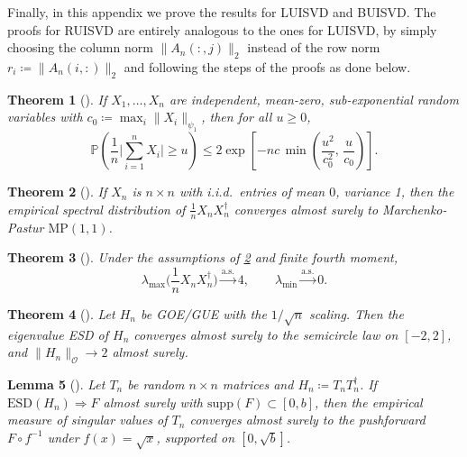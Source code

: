 \documentclass[11pt,a4paper]{article}
\newtheorem{theorem}{Theorem}[section]
\newtheorem{lemma}[theorem]{Lemma}
\newcommand{\op}{\mathcal{O}}
\newcommand{\Prob}{\mathbb{P}}
\begin{document}
Finally, in this appendix we prove the results for LUISVD and BUISVD. The proofs for RUISVD are entirely analogous to the ones for LUISVD, by simply choosing the column norm $\|A_n(:,j)\|_2$ instead of the row norm $r_i\coloneq \|A_n(i,:)\|_2$ and following the steps of the proofs as done below.
\begin{theorem}[{\cite{Vershynin2018HDP}}]\label{thm:bernstein-subexp}
If $X_1,\dots,X_n$ are independent, mean-zero, sub-exponential random variables with $c_0\coloneq \max_i\|X_i\|_{\psi_1}$, then for all $u\ge0$,
\begin{equation}
\Prob\!\left(\frac{1}{n}\Big|\sum_{i=1}^n X_i\Big|\ge u\right)\le 2\exp\!\left[-nc\,\min\!\left(\frac{u^2}{c_0^2},\,\frac{u}{c_0}\right)\right].
\end{equation}
\end{theorem}
\begin{theorem}[{\cite{BaiSilverstein2010}}]\label{thm:MP-law}
If $X_n$ is $n\times n$ with i.i.d.\ entries of mean $0$, variance 1, then the empirical spectral distribution of $\frac1n X_nX_n^\dagger$ converges almost surely to Marchenko-Pastur $\mathrm{MP}(1,1)$.
\end{theorem}
\begin{theorem}[{\cite{BaiSilverstein2010}}]\label{thm:MP-edge}
Under the assumptions of \cref{thm:MP-law} and finite fourth moment,
\begin{equation}
\lambda_{\max}\!\Big(\frac1n X_nX_n^\dagger\Big)\xrightarrow{\mathrm{a.s.}}4,\qquad
\lambda_{\min}\xrightarrow{\mathrm{a.s.}}0.
\end{equation}
\end{theorem}
\begin{theorem}[{\cite{Tao2012TRMT}}]\label{thm:wigner-law}
Let $H_n$ be GOE/GUE with the $1/\sqrt n$ scaling. Then the eigenvalue ESD of $H_n$ converges almost surely to the semicircle law on $[-2,2]$, and $\|H_n\|_{\op}\to 2$ almost surely.
\end{theorem}
\begin{lemma}[{\cite{Billingsley:Convergence,Tao2012TRMT}}]\label{thm:pushforward}
Let $T_n$ be random $n\times n$ matrices and $H_n\coloneq T_nT_n^\dagger$. If $\mathrm{ESD}(H_n)\Rightarrow F$ \emph{almost surely} with $\mathrm{supp}(F)\subset[0,b]$, then the empirical measure of singular values of $T_n$ converges almost surely to the pushforward $F\circ f^{-1}$ under $f(x)=\sqrt{x}$, supported on $[0,\sqrt b]$.
\end{lemma}
\end{document}
